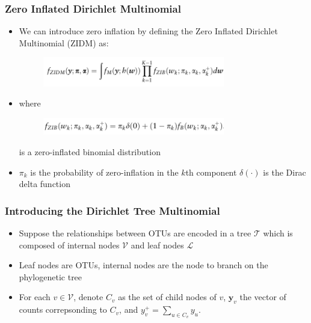 \documentclass{beamer}
\begin{document}
\begin{frame}
\frametitle{Zero Inflated Dirichlet Multinomial}
\begin{itemize}
  \item We can introduce zero inflation by defining the Zero Inflated Dirichlet Multinomial (ZIDM) as:
\begin{figure}[!htb]
	\centering
	\includegraphics[width=0.75\textwidth]{img/zidm.png}
\end{figure}

\item where
\begin{figure}[!htb]
	\centering
	\includegraphics[width=0.75\textwidth]{img/zib.png}
\end{figure}
is a zero-inflated binomial distribution

\item $\pi_k$ is the probability of zero-inflation in the $k$th component $\delta(\cdot)$ is the Dirac delta function

\end{itemize}
\end{frame}
\begin{frame}
\frametitle{Introducing the Dirichlet Tree Multinomial}

\begin{itemize}
  \item Suppose the relationships between OTUs are encoded in a tree $\mathcal{T}$ which is composed of internal nodes $\mathcal{V}$ and leaf nodes $\mathcal{L}$
  \item Leaf nodes are OTUs, internal nodes are the node to branch on the phylogenetic tree
  \item For each $v \in \mathcal{V}$, denote $C_v$ as the set of child nodes of $v$, $\boldsymbol y_v$ the vector of counts correpsonding to $C_v$, and $y_v^+ = \sum_{u \in C_v} y_u$.

\end{itemize}

\end{frame}
\end{document}
